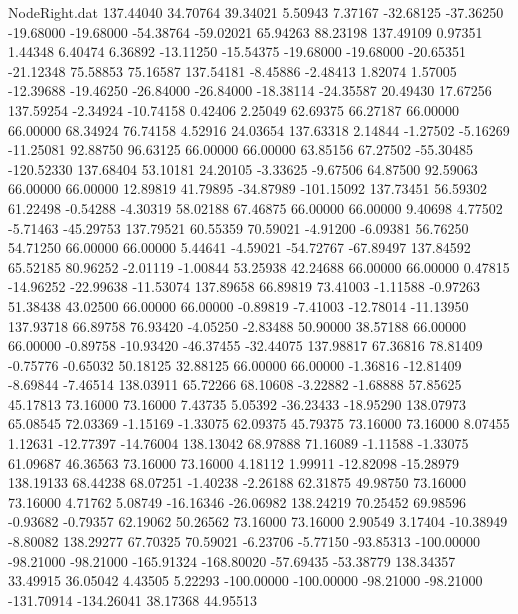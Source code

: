 \begin{filecontents}{NodeRight.dat}
 137.44040   34.70764   39.34021     5.50943    7.37167  -32.68125  -37.36250  -19.68000  -19.68000  -54.38764  -59.02021   65.94263   88.23198
 137.49109    0.97351    1.44348     6.40474    6.36892  -13.11250  -15.54375  -19.68000  -19.68000  -20.65351  -21.12348   75.58853   75.16587
 137.54181   -8.45886   -2.48413     1.82074    1.57005  -12.39688  -19.46250  -26.84000  -26.84000  -18.38114  -24.35587   20.49430   17.67256
 137.59254   -2.34924  -10.74158     0.42406    2.25049   62.69375   66.27187   66.00000   66.00000   68.34924   76.74158    4.52916   24.03654
 137.63318    2.14844   -1.27502    -5.16269  -11.25081   92.88750   96.63125   66.00000   66.00000   63.85156   67.27502  -55.30485 -120.52330
 137.68404   53.10181   24.20105    -3.33625   -9.67506   64.87500   92.59063   66.00000   66.00000   12.89819   41.79895  -34.87989 -101.15092
 137.73451   56.59302   61.22498    -0.54288   -4.30319   58.02188   67.46875   66.00000   66.00000    9.40698    4.77502   -5.71463  -45.29753
 137.79521   60.55359   70.59021    -4.91200   -6.09381   56.76250   54.71250   66.00000   66.00000    5.44641   -4.59021  -54.72767  -67.89497
 137.84592   65.52185   80.96252    -2.01119   -1.00844   53.25938   42.24688   66.00000   66.00000    0.47815  -14.96252  -22.99638  -11.53074
 137.89658   66.89819   73.41003    -1.11588   -0.97263   51.38438   43.02500   66.00000   66.00000   -0.89819   -7.41003  -12.78014  -11.13950
 137.93718   66.89758   76.93420    -4.05250   -2.83488   50.90000   38.57188   66.00000   66.00000   -0.89758  -10.93420  -46.37455  -32.44075
 137.98817   67.36816   78.81409    -0.75776   -0.65032   50.18125   32.88125   66.00000   66.00000   -1.36816  -12.81409   -8.69844   -7.46514
 138.03911   65.72266   68.10608    -3.22882   -1.68888   57.85625   45.17813   73.16000   73.16000    7.43735    5.05392  -36.23433  -18.95290
 138.07973   65.08545   72.03369    -1.15169   -1.33075   62.09375   45.79375   73.16000   73.16000    8.07455    1.12631  -12.77397  -14.76004
 138.13042   68.97888   71.16089    -1.11588   -1.33075   61.09687   46.36563   73.16000   73.16000    4.18112    1.99911  -12.82098  -15.28979
 138.19133   68.44238   68.07251    -1.40238   -2.26188   62.31875   49.98750   73.16000   73.16000    4.71762    5.08749  -16.16346  -26.06982
 138.24219   70.25452   69.98596    -0.93682   -0.79357   62.19062   50.26562   73.16000   73.16000    2.90549    3.17404  -10.38949   -8.80082
 138.29277   67.70325   70.59021    -6.23706   -5.77150  -93.85313 -100.00000  -98.21000  -98.21000 -165.91324 -168.80020  -57.69435  -53.38779
 138.34357   33.49915   36.05042     4.43505    5.22293 -100.00000 -100.00000  -98.21000  -98.21000 -131.70914 -134.26041   38.17368   44.95513

\end{filecontents}
